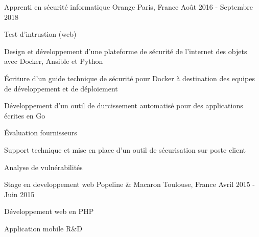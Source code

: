 
\begin{cventries}

  \cventry
    {Apprenti en sécurité informatique} %
    {Orange} %
    {Paris, France} %
    {Août 2016 - Septembre 2018} %
    {
      \begin{cvitems} %
        \item {Test d'intrustion (web)}
        \item {Design et développement d'une plateforme de sécurité de l’internet des objets avec Docker, Ansible et Python}
        \item {Écriture d'un guide technique de sécurité pour Docker à destination des equipes de développement et de déploiement}
        \item {Développement d'un outil de durcissement automatisé pour des applications écrites en Go}
        \item {Évaluation fournisseurs}
        \item {Support technique et mise en place d'un outil de sécurisation sur poste client}
        \item {Analyse de vulnérabilités}
      \end{cvitems}
    }
  \cventry
    {Stage en developpement web} %
    {Popeline \& Macaron} %
    {Toulouse, France} %
    {Avril 2015 - Juin 2015} %
    {
      \begin{cvitems} %
        \item {Développement web en PHP}
        \item {Application mobile R\&D}
      \end{cvitems}
    }
\end{cventries}
